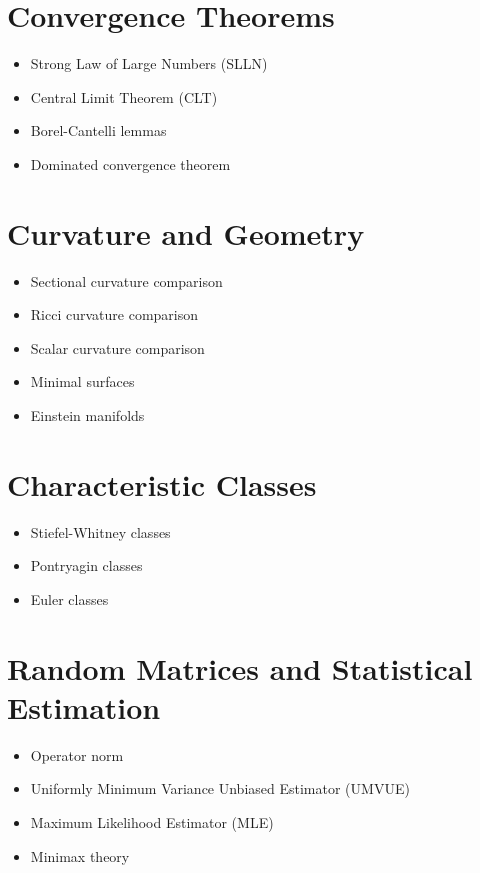 \documentclass{amsart}
\begin{document}
\section{Convergence Theorems}
\begin{itemize}
    \item Strong Law of Large Numbers (SLLN)
    \item Central Limit Theorem (CLT)
    \item Borel-Cantelli lemmas
    \item Dominated convergence theorem
\end{itemize}

\section{Curvature and Geometry}
\begin{itemize}
    \item Sectional curvature comparison
    \item Ricci curvature comparison
    \item Scalar curvature comparison
    \item Minimal surfaces
    \item Einstein manifolds
\end{itemize}

\section{Characteristic Classes}
\begin{itemize}
    \item Stiefel-Whitney classes
    \item Pontryagin classes
    \item Euler classes
\end{itemize}

\section{Random Matrices and Statistical Estimation}
\begin{itemize}
    \item Operator norm
    \item Uniformly Minimum Variance Unbiased Estimator (UMVUE)
    \item Maximum Likelihood Estimator (MLE)
    \item Minimax theory
\end{itemize}
\end{document}
